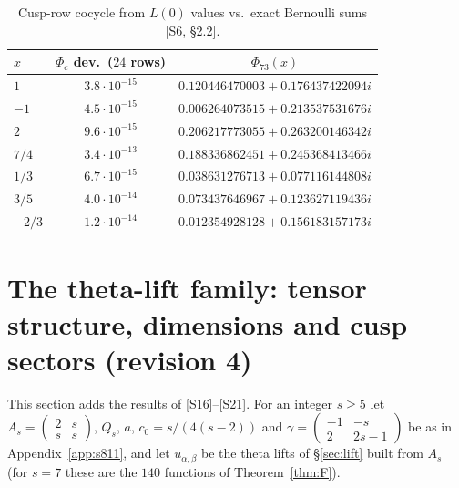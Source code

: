 \documentclass[11pt]{article}
\theoremstyle{definition}
\newcommand{\src}[1]{\textup{[S#1]}}
\begin{document}
\begin{table}[ht]\centering\small
\begin{tabular}{lcc}\toprule
$x$ & $\Phi_c$ dev.\ ($24$ rows) & $\Phi_{73}(x)$\\\midrule
$1$ & $3.8\cdot10^{-15}$ & $0.120446470003+0.176437422094i$\\
$-1$ & $4.5\cdot10^{-15}$ & $0.006264073515+0.213537531676i$\\
$2$ & $9.6\cdot10^{-15}$ & $0.206217773055+0.263200146342i$\\
$7/4$ & $3.4\cdot10^{-13}$ & $0.188336862451+0.245368413466i$\\
$1/3$ & $6.7\cdot10^{-15}$ & $0.038631276713+0.077116144808i$\\
$3/5$ & $4.0\cdot10^{-14}$ & $0.073437646967+0.123627119436i$\\
$-2/3$ & $1.2\cdot10^{-14}$ & $0.012354928128+0.156183157173i$\\\bottomrule
\end{tabular}
\caption{Cusp-row cocycle from $L(0)$ values vs.\ exact Bernoulli sums \src{6, \S2.2}.}\label{tab:phi73}
\end{table}

\section{The theta-lift family: tensor structure, dimensions and cusp sectors (revision 4)}\label{sec:family}
This section adds the results of \src{16}--\src{21}. For an integer $s\ge5$ let $A_s=\begin{pmatrix}2&s\\s&s\end{pmatrix}$, $Q_s$, $a$, $c_0=s/(4(s-2))$ and
$\gamma=\begin{pmatrix}-1&-s\\2&2s-1\end{pmatrix}$ be as in Appendix~\ref{app:s811}, and let $u_{\alpha,\beta}$ be the theta lifts of \S\ref{sec:lift} built from $A_s$
(for $s=7$ these are the $140$ functions of Theorem~\ref{thm:F}).
\end{document}

